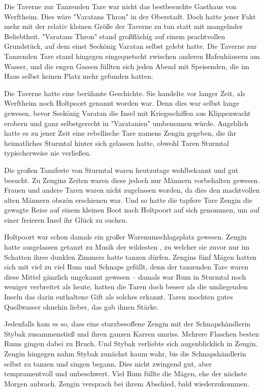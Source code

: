 Die Taverne zur Tanzenden Tare war nicht das bestbesuchte Gasthaus von Werftheim. Dies wäre "Varatans Thron" in der Oberstadt. Doch hatte jener Fakt mehr mit der relativ kleinen Größe der Taverne zu tun statt mit mangelnder Beliebtheit. "Varatans Thron" stand großflächig auf einem prachtvollen Grundstück, auf dem einst Seekönig Varatan selbst gelebt hatte. Die Taverne zur Tanzenden Tare stand hingegen eingequetscht zwischen anderen Hafenhäusern am Wasser, und die engen Gassen füllten sich jeden Abend mit Speisenden, die im Haus selbst keinen Platz mehr gefunden hatten.

Die Taverne hatte eine berühmte Geschichte. Sie handelte vor langer Zeit, als Werftheim noch Holtpoort genannt worden war. Denn dies war selbst lange gewesen, bevor Seekönig Varatan die Insel mit Kriegsschiffen aus Klippenwacht erobern und ganz selbstgerecht in "Varatanien" umbenennen würde. Angeblich hatte es zu jener Zeit eine rebellische Tare namens Zengin gegeben, die ihr heimatliches Sturmtal hinter sich gelassen hatte, obwohl Taren Sturmtal typischerweise nie verließen. 

Die großen Tanzfeste von Sturmtal waren heutzutage wohlbekannt und gut besucht. Zu Zengins Zeiten waren diese jedoch nur Männern vorbehalten gewesen. Frauen und andere Taren waren nicht zugelassen worden, da dies den machtvollen alten Männern obszön erschienen war. Und so hatte die tapfere Tare Zengin die gewagte Reise auf einem kleinen Boot nach Holtpoort auf sich genommen, um auf einer freieren Insel ihr Glück zu suchen.

Holtpoort war schon damals ein großer Warenumschlagsplatz gewesen. Zengin hatte ausgelassen getanzt zu Musik der wildesten , zu welcher sie zuvor nur im Schatten ihres dunklen Zimmers hatte tanzen dürfen. Zengins fünf Mägen hatten sich mit viel zu viel Rum und Schnaps gefüllt, denn der tanzenden Tare waren diese Mittel gänzlich ungekannt gewesen – damals war Rum in Sturmtal noch weniger verbreitet als heute, hatten die Taren doch besser als die umliegenden Inseln das darin enthaltene Gift als solches erkannt. Taren mochten gutes Quellwasser ohnehin lieber, das gab ihnen Stärke. 

Jedenfalls kam es so, dass eine sturzbesoffene Zengin mit der Schnapshändlerin Stybak zusammenstieß und ihren ganzen Karren umriss. Mehrere Flaschen besten Rums gingen dabei zu Bruch. Und Stybak verliebte sich augenblicklich in Zengin. Zengin hingegen nahm Stybak zunächst kaum wahr, bis die Schnapshändlerin selbst zu tanzen und singen begann. Dies nicht zwingend gut, aber tempramentvoll und unbeschwert. Viel Rum füllte die Mägen, ehe der nächste Morgen anbrach. Zengin versprach bei ihrem Abschied, bald wiederzukommen. 

